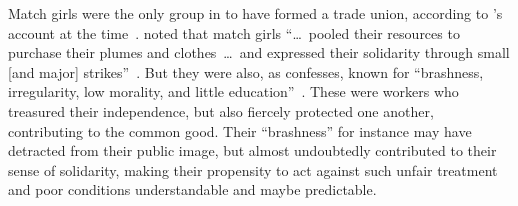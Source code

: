 \documentclass[trackingWork]{subfiles}
\begin{document}
Match girls were the only group in \citeyear{booth1903life} to have formed a trade union,
according to \citeauthor{booth1903life}'s account at the time~\cite{booth1903life}.
\citeauthor{10.2307/3827491} noted that match girls
``\dots~pooled their resources to purchase their plumes and clothes~\dots~and expressed their solidarity through small [and major] strikes''~\cite{booth1903life}.
But they were also, as \citeauthor{10.2307/3827491} confesses, known for ``brashness, irregularity, low morality, and little education''~\cite{10.2307/3827491}.
These were workers who treasured their independence, but also fiercely protected one another, contributing to the common good.
Their ``brashness'' for instance may have detracted from their public image, but almost undoubtedly contributed to their sense of solidarity,
making their propensity to act against such unfair treatment and poor conditions understandable and maybe predictable.





\end{document}
